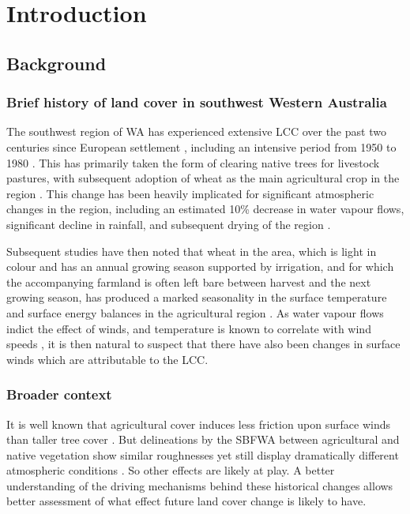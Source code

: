 \chapter{Introduction}
\label{ch:intro}

\section{Background}

\subsection[Brief history of WA LCC]{Brief history of land cover in southwest Western Australia}

The southwest region of \ac{WA} has experienced extensive \ac{LCC} over the past two centuries since European settlement \citep{narisma2003}, including an intensive period from 1950 to 1980 \citep{xinmei1995}. This has primarily taken the form of clearing native trees for livestock pastures, with subsequent adoption of wheat as the main agricultural crop in the region \citep{narisma2003, xinmei1995}. This change has been heavily implicated for significant atmospheric changes in the region, including an estimated 10\% decrease in water vapour flows, significant decline in rainfall, and subsequent drying of the region \citep{gordon2003}.

Subsequent studies have then noted that wheat in the area, which is light in colour and has an annual growing season supported by irrigation, and for which the accompanying farmland is often left bare between harvest and the next growing season, has produced a marked seasonality in the surface temperature and surface energy balances in the agricultural region \citep{lyons1996}. As water vapour flows indict the effect of winds, and temperature is known to correlate with wind speeds \citep{lapworth2003, lapworth2006}, it is then natural to suspect that there have also been changes in surface winds which are attributable to the \ac{LCC}. 

\subsection{Broader context}

It is well known that agricultural cover induces less friction upon surface winds than taller tree cover \citep{geiger1950}. But delineations by the \ac{SBFWA} between agricultural and native vegetation show similar roughnesses \citep{lyons2001} yet still display dramatically different atmospheric conditions \citep{ray2003}. So other effects are likely at play. A better understanding of the driving mechanisms behind these historical changes allows better assessment of what effect future land cover change is likely to have.

